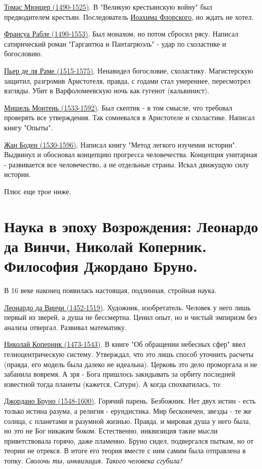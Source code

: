 \underline{Томас Мюнцер (1490-1525)}. В "Великую крестьянскую войну" был предводителем крестьян. Последователь \underline{Иоахима Флорского}, но ждать не хотел.

\underline{Франсуа Рабле (1490-1553)}. Был монахом, но потом сбросил рясу. Написал сатирический роман "Гаргантюа и Пантагрюэль" - удар по схоластике и богословию.

\underline{Пьер де ля Раме (1515-1575)}. Ненавидел богословие, схоластику. Магистерскую защитил, разгромив Аристотеля, правда, с годами стал умереннее, пересмотрел взгляды. Убит в Варфоломеевскую ночь как гугенот (кальвинист).

\underline{Мишель Монтень (1533-1592)}. Был скептик - в том смысле, что требовал проверять все утверждения. Так сомневался в Аристотеле и схоластике. Написал книгу "Опыты".

\underline{Жан Боден (1530-1596)}. Написал книгу "Метод легкого изучения истории". Выдвинул и обосновал концепцию прогресса человечества. Концепция унитарная - развивается все человечество, а не отдельные страны. Искал движущую силу истории.

Плюс еще трое ниже.

\section{Наука в эпоху Возрождения: Леонардо да Винчи, Николай Коперник. Философия Джордано Бруно.}
В 16 веке наконец появилась настоящая, подлинная, стройная наука. 

\underline{Леонардо да Винчи (1452-1519)}. Художник, изобретатель. Человек у него лишь первый из зверей, а душа не бессмертна. Ценил опыт, но и чистый эмпиризм без анализа отвергал. Развивал математику.

\underline{Николай Коперник (1473-1543)}. В книге "Об обращении небесных сфер" ввел гелиоцентрическую систему. Утверждал, что это лишь способ уточнить расчеты (правда, его модель была далеко не идеальна). Церковь это дело проморгала и не забанила вовремя. А зря - Бога пришлось закидывать за орбиту последней известной тогда планеты (кажется, Сатурн). А когда спохватилась, то:

\underline{Джордано Бруно (1548-1600)}. Горячий парень. Безбожник. Нет двух истин - есть только истина разума, а религия - ерундистика. Мир бесконечен, звезды - те же солнца, с планетами и разумной жизнью. Правда, и мировая душа у него была, но это не Бог никаким боком. Естественно, инквизиция такие мысли приветствовала горячо, даже пламенно. Бруно сидел, подвергался пыткам, но от теории не отрекся. В итоге его теория вместе с ним самим была отправлена в топку. \textit{Сволочь ты, инквизиция. Такого человека сгубила!}

\newpage

\newpage



\grid
